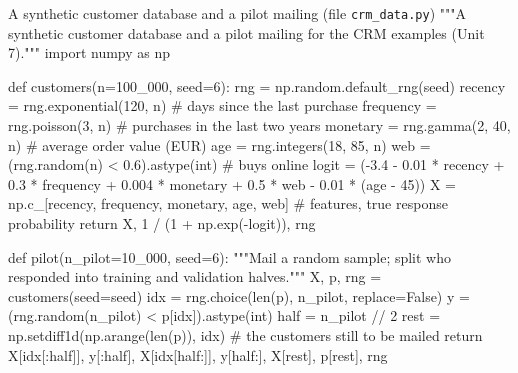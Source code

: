 \begin{pylisting}[label={lst:crmdata}]{A synthetic customer database and a pilot mailing (file \texttt{crm\_data.py})}
"""A synthetic customer database and a pilot mailing for the CRM examples (Unit 7)."""
import numpy as np

def customers(n=100_000, seed=6):
    rng = np.random.default_rng(seed)
    recency = rng.exponential(120, n)                  # days since the last purchase
    frequency = rng.poisson(3, n)                      # purchases in the last two years
    monetary = rng.gamma(2, 40, n)                     # average order value (EUR)
    age = rng.integers(18, 85, n)
    web = (rng.random(n) < 0.6).astype(int)            # buys online
    logit = (-3.4 - 0.01 * recency + 0.3 * frequency
             + 0.004 * monetary + 0.5 * web - 0.01 * (age - 45))
    X = np.c_[recency, frequency, monetary, age, web]
    # features, true response probability
    return X, 1 / (1 + np.exp(-logit)), rng

def pilot(n_pilot=10_000, seed=6):
    """Mail a random sample; split who responded into training and validation halves."""
    X, p, rng = customers(seed=seed)
    idx = rng.choice(len(p), n_pilot, replace=False)
    y = (rng.random(n_pilot) < p[idx]).astype(int)
    half = n_pilot // 2
    rest = np.setdiff1d(np.arange(len(p)), idx)        # the customers still to be mailed
    return X[idx[:half]], y[:half], X[idx[half:]], y[half:], X[rest], p[rest], rng
\end{pylisting}


